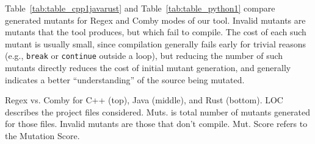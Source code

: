 \documentclass[acmsmall]{acmart}
\begin{document}
{Table~\ref{tab:table_cpp1javarust} and Table~\ref{tab:table_python1} compare generated
mutants for Regex and Comby modes of our tool.  Invalid
mutants are mutants that the tool produces, but which fail to
compile.  The cost of each such mutant is usually small,
since compilation generally fails early for trivial reasons (e.g.,
{\tt break} or {\tt continue} outside a loop), 
but reducing the number of such mutants directly reduces the cost of
initial mutant generation, and generally indicates a better
``understanding'' of the source being mutated.

\begin{table}[hbtp]
\centering
\small
\footnotesize
\caption{Regex vs. Comby for C++ (top), Java (middle), and Rust (bottom). LOC describes the project files considered. Muts. is total number of mutants generated for those files. Invalid mutants are those that don't compile. Mut. Score refers to the Mutation Score.}
\label{tab:table_cpp1javarust}


\end{table}}
\end{document}
